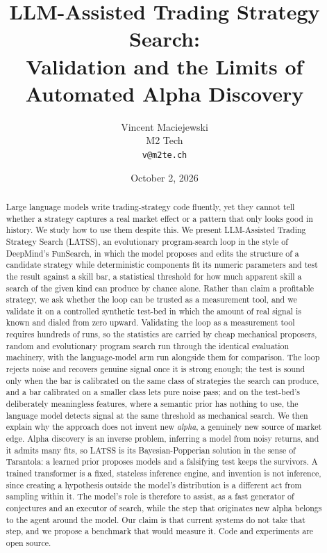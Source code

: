 \documentclass[11pt]{article}
\title{\textbf{LLM-Assisted Trading Strategy Search:\\
Validation and the Limits of Automated Alpha Discovery}}
\author{Vincent Maciejewski\\
\small M2 Tech\\
\small \texttt{v@m2te.ch}}
\date{October 2, 2026}
\begin{document}
\maketitle

\begin{abstract}
Large language models write trading-strategy code fluently, yet they cannot tell whether a strategy
captures a real market effect or a pattern that only looks good in history. We study how to use them
despite this. We present LLM-Assisted Trading Strategy Search (LATSS), an evolutionary program-search
loop in the style of DeepMind's FunSearch, in which the model proposes and edits the structure of a
candidate strategy while deterministic components fit its numeric parameters and test the result against
a skill bar, a statistical threshold for how much apparent skill a search of the given kind can produce
by chance alone. Rather than claim a profitable strategy, we ask whether the loop
can be trusted as a measurement tool, and we validate it on a controlled synthetic test-bed in
which the amount of real signal is known and dialed from zero upward. Validating the loop as a measurement
tool requires hundreds of runs, so the statistics are carried by cheap mechanical proposers, random and
evolutionary program search run through the identical evaluation machinery, with the language-model arm
run alongside them for comparison. The loop rejects noise and recovers genuine signal once it is strong enough;
the test is sound only when the bar is calibrated on the same class of strategies the search can produce,
and a bar calibrated on a smaller class lets pure noise pass; and on the test-bed's deliberately
meaningless features, where a semantic prior has nothing to use, the language model detects signal at
the same threshold as mechanical search. We then explain why the
approach does not invent new \emph{alpha}, a genuinely new source of market edge. Alpha discovery is an
inverse problem, inferring a model from noisy returns, and it admits many fits, so LATSS is its
Bayesian-Popperian solution in the sense of Tarantola: a learned prior proposes models and a falsifying
test keeps the survivors. A trained transformer is a fixed,
stateless inference engine, and invention is not inference, since creating a hypothesis outside the
model's distribution is a different act from sampling within it. The model's role is therefore to assist,
as a fast generator of conjectures and an executor of search, while the step that originates new alpha
belongs to the agent around the model. Our claim is that current systems do not take that step, and we
propose a benchmark that would measure it. Code and experiments are open source.
\end{abstract}
\end{document}
